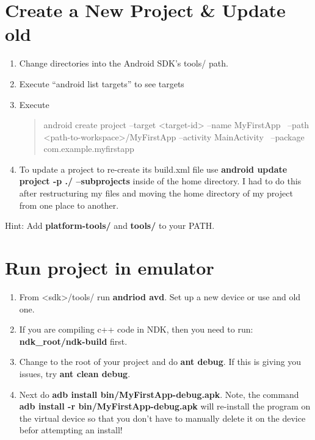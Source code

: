 \documentclass[english]{article}
\begin{document}
\section*{Create a New Project \& Update old}
\begin{enumerate}
\item
Change directories into the Android SDK's tools/ path.
\item
Execute ``android list targets'' to see targets
\item
Execute
\begin{quote}
android create project --target <target-id> --name MyFirstApp \
--path <path-to-workspace>/MyFirstApp --activity MainActivity \
--package com.example.myfirstapp
\end{quote}
\item
To update a project to re-create its build.xml file use \textbf{android update project -p ./ --subprojects} inside of the home directory. I had to do this after restructuring my files and moving the home directory of my project from one place to another.
\end{enumerate}
Hint: Add \textbf{platform-tools/} and \textbf{tools/} to your PATH.


\section*{Run project in emulator}
\begin{enumerate}
\item
From <sdk>/tools/ run \textbf{andriod avd}. Set up a new device or use and old one.
\item
If you are compiling c++ code in NDK, then you need to run: \textbf{ndk\_root/ndk-build} first.
\item
Change to the root of your project and do \textbf{ant debug}. If this is giving you issues, try \textbf{ant clean debug}.
\item
Next do \textbf{adb install bin/MyFirstApp-debug.apk}. Note, the command \textbf{adb install -r bin/MyFirstApp-debug.apk} will re-install the program on the virtual device so that you don't have to manually delete it on the device befor attempting an install!
\end{enumerate}
\end{document}

